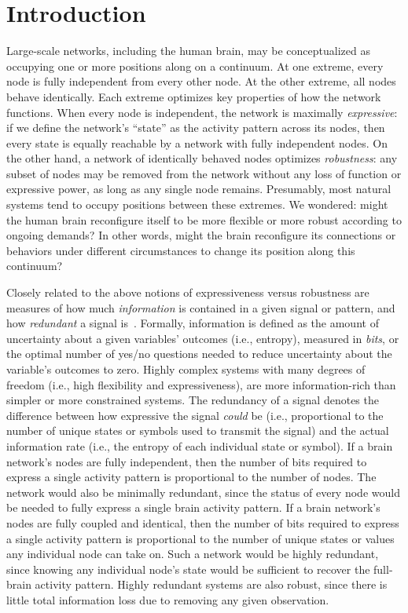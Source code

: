 \documentclass[english, 11pt]{article}
\begin{document}
\doublespacing

\section*{Introduction}

Large-scale networks, including the human brain, may be conceptualized as
occupying one or more positions along on a continuum. At one extreme, every
node is fully independent from every other node. At the other extreme, all
nodes behave identically. Each extreme optimizes key properties of how the
network functions. When every node is independent, the network is maximally
\textit{expressive}: if we define the network's ``state'' as the activity
pattern across its nodes, then every state is equally reachable by a network
with fully independent nodes. On the other hand, a network of identically
behaved nodes optimizes \textit{robustness}: any subset of nodes may be removed
from the network without any loss of function or expressive power, as long as
any single node remains. Presumably, most natural systems tend to occupy
positions between these extremes. We wondered: might the human brain
reconfigure itself to be more flexible or more robust according to ongoing
demands? In other words, might the brain reconfigure its connections or
behaviors under different circumstances to change its position along this
continuum?

Closely related to the above notions of expressiveness versus robustness are
measures of how much \textit{information} is contained in a given signal or
pattern, and how \textit{redundant} a signal is~\citep{Shan48}. Formally,
information is defined as the amount of uncertainty about a given variables'
outcomes (i.e., entropy), measured in \textit{bits}, or the optimal number of
yes/no questions needed to reduce uncertainty about the variable's outcomes to
zero. Highly complex systems with many degrees of freedom (i.e., high
flexibility and expressiveness), are more information-rich than simpler or more
constrained systems. The redundancy of a signal denotes the difference between
how expressive the signal \textit{could} be (i.e., proportional to the number
of unique states or symbols used to transmit the signal) and the actual
information rate (i.e., the entropy of each individual state or symbol). If a
brain network's nodes are fully independent, then the number of bits required
to express a single activity pattern is proportional to the number of nodes.
The network would also be minimally redundant, since the status of every node
would be needed to fully express a single brain activity pattern. If a brain
network's nodes are fully coupled and identical, then the number of bits
required to express a single activity pattern is proportional to the number of
unique states or values any individual node can take on. Such a network would
be highly redundant, since knowing any individual node's state would be
sufficient to recover the full-brain activity pattern. Highly redundant systems
are also robust, since there is little total information loss due to removing
any given observation.
\end{document}
